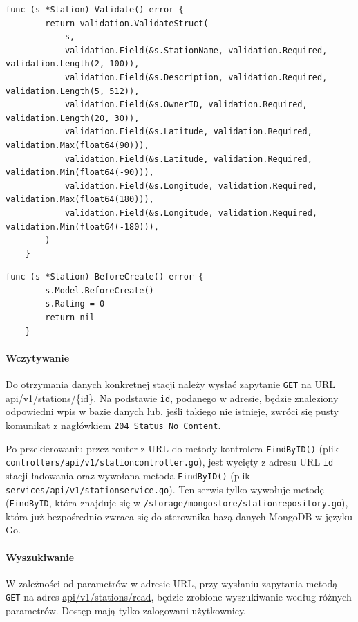 \begin{lstlisting}[label=list:validation_station,caption=Walidacja danych stacji ładowania,basicstyle=\tiny\ttfamily]
    func (s *Station) Validate() error {
        return validation.ValidateStruct(
            s,
            validation.Field(&s.StationName, validation.Required, validation.Length(2, 100)),
            validation.Field(&s.Description, validation.Required, validation.Length(5, 512)),
            validation.Field(&s.OwnerID, validation.Required, validation.Length(20, 30)),
            validation.Field(&s.Latitude, validation.Required, validation.Max(float64(90))),
            validation.Field(&s.Latitude, validation.Required, validation.Min(float64(-90))),
            validation.Field(&s.Longitude, validation.Required, validation.Max(float64(180))),
            validation.Field(&s.Longitude, validation.Required, validation.Min(float64(-180))),
        )
    }
\end{lstlisting}

\begin{lstlisting}[label=list:before_create_station,caption=Uzupełnienie danych systemowych dotyczących,basicstyle=\tiny\ttfamily]
    func (s *Station) BeforeCreate() error {
        s.Model.BeforeCreate()
        s.Rating = 0
        return nil
    }
\end{lstlisting}

\paragraph{Wczytywanie\newline}
Do otrzymania danych konkretnej stacji należy wysłać zapytanie \texttt{GET} na URL \url{api/v1/stations/{id}}.
Na podstawie \texttt{id}, podanego w adresie, będzie znaleziony odpowiedni wpis w bazie danych lub, jeśli takiego nie istnieje, zwróci się pusty komunikat z nagłówkiem \texttt{204 Status No Content}.

Po przekierowaniu przez router z URL do metody kontrolera \texttt{FindByID()} (plik \texttt{controllers/api/v1/stationcontroller.go}), jest wycięty z adresu URL \texttt{id} stacji ładowania oraz wywołana metoda \texttt{FindByID()} (plik \texttt{services/api/v1/stationservice.go}).
Ten serwis tylko wywołuje metodę (\texttt{FindByID}, która znajduje się w \texttt{/storage/mongostore/stationrepository.go}), która już bezpośrednio zwraca się do sterownika bazą danych MongoDB w języku Go.
%
\paragraph{Wyszukiwanie\newline}
W zależności od parametrów w adresie URL, przy wysłaniu zapytania metodą \texttt{GET} na adres \url{api/v1/stations/read}, będzie zrobione wyszukiwanie według różnych parametrów.
Dostęp mają tylko zalogowani użytkownicy.

